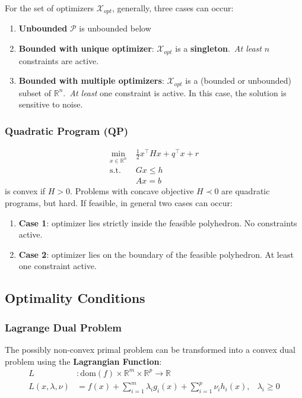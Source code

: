 \newpar{}
For the set of optimizers $\mathcal{X}_{opt}$, generally, three cases can occur:
\begin{enumerate}
    \item \textbf{Unbounded} $\mathcal{P}$ is unbounded below
    \item \textbf{Bounded with unique optimizer}: $\mathcal{X}_{opt}$ is a \textbf{singleton}.\ \textit{At least} $n$ constraints are active.
    \item \textbf{Bounded with multiple optimizers}: $\mathcal{X}_{opt}$ is a (bounded or unbounded) subset of $\mathbb{R}^n$.\ \textit{At least} one constraint is active. In this case, the solution is sensitive to noise. %
\end{enumerate}

\subsubsection{Quadratic Program (QP)}
\noindent
\begin{align*}
    \min_{x\in\mathbb{R}^n}\; & \frac{1}{2}x^\top H x + q^\top x + r \\
    \mathrm{s.t.}\;           & Gx \leq h                            \\
                              & Ax = b
\end{align*}
is convex if $H>0$.
\newpar{}
Problems with concave objective $H\prec 0$ are quadratic programs, but hard.
\newpar{}
If feasible, in general two cases can occur:
\begin{enumerate}
    \item \textbf{Case 1}: optimizer lies strictly inside the feasible polyhedron. No constraints active.
    \item \textbf{Case 2}: optimizer lies on the boundary of the feasible polyhedron. At least one constraint active.
\end{enumerate}

\subsection{Optimality Conditions}

\subsubsection{Lagrange Dual Problem}
The possibly non-convex primal problem can be transformed into a convex dual problem using the \textbf{Lagrangian Function}:
\begin{align*}
    L                & : \mathrm{dom}\left(f\right)\times\mathbb{R}^m\times\mathbb{R}^p \to\mathbb{R}                   \\
    L(x,\lambda,\nu) & =f(x)+\sum_{i=1}^{m}\lambda_i g_i(x) + \sum_{i=1}^{p}\nu_i h_i(x),             & \lambda_i\geq 0
\end{align*}

